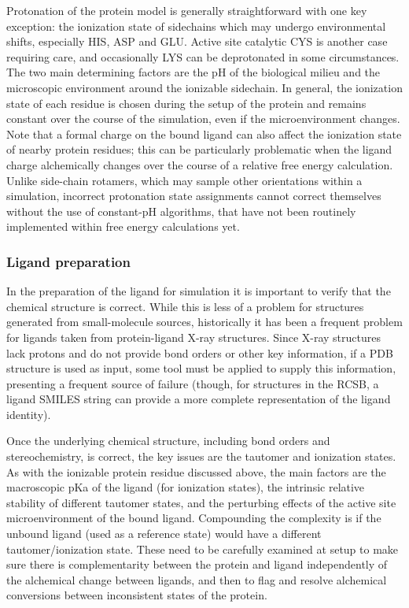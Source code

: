 \documentclass[9pt,bestpractices]{livecoms}
\begin{document}
Protonation of the protein model is generally straightforward with one key exception: the ionization state of sidechains which may undergo environmental shifts, especially HIS, ASP and GLU. Active site catalytic CYS is another case requiring care, and occasionally LYS can be deprotonated in some circumstances. The two main determining factors are the pH of the biological milieu and the microscopic environment around the ionizable sidechain. In general, the ionization state of each residue is chosen during the setup of the protein and remains constant over the course of the simulation, even if the microenvironment changes. 
Note that a formal charge on the bound ligand can also affect the ionization state of nearby protein residues; this can be particularly problematic when the ligand charge alchemically changes over the course of a relative free energy calculation. Unlike side-chain rotamers, which may sample other orientations within a simulation, incorrect protonation state assignments cannot correct themselves without the use of constant-pH algorithms, that have not been routinely implemented within free energy calculations yet. 

\subsubsection{Ligand preparation}

In the preparation of the ligand for simulation it is important to verify that the chemical structure is correct. While this is less of a problem for structures generated from small-molecule sources, historically it has been a frequent problem for ligands taken from protein-ligand X-ray structures. Since X-ray structures lack protons and do not provide bond orders or other key information, if a PDB structure is used as input, some tool must be applied to supply this information, presenting a frequent source of failure (though, for structures in the RCSB, a ligand SMILES string can provide a more complete representation of the ligand identity).

Once the underlying chemical structure, including bond orders and stereochemistry, is correct, the key issues are the  tautomer and ionization states. As with the ionizable protein residue discussed above, the main factors are the macroscopic pKa of the ligand (for ionization states), the intrinsic relative stability of different tautomer states, and the perturbing effects of the active site microenvironment of the bound ligand. Compounding the complexity is if the unbound ligand (used as a reference state) would have a different tautomer/ionization state. These need to be carefully examined at setup to make sure there is complementarity between the protein and ligand independently of the alchemical change between ligands, and then to flag and resolve alchemical conversions between inconsistent states of the protein.
\end{document}
